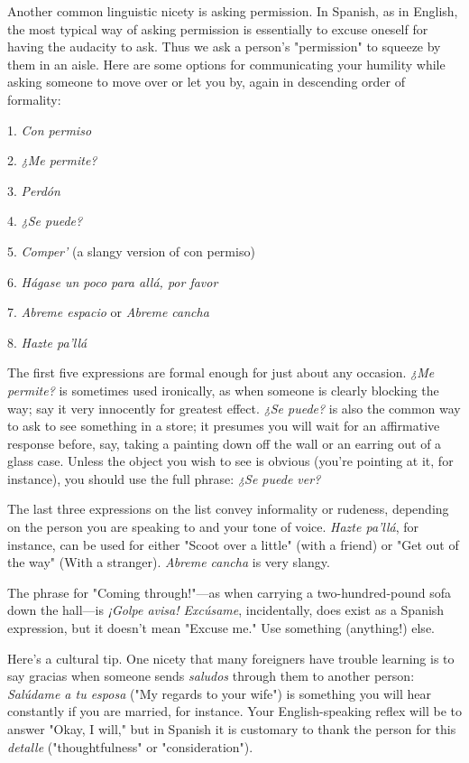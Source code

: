 \documentclass[14pt,a4paper,oneside]{memoir}
\newcommand{\bsk}{\vspace{20pt}}
\begin{document}
Another common linguistic nicety is asking permission. In
Spanish, as in English, the most typical way of asking permission is
essentially to excuse oneself for having the audacity to ask. Thus we
ask a person's "permission" to squeeze by them in an aisle. Here are
some options for communicating your humility while asking someone
to move over or let you by, again in descending order of formality:

\bsk

1. \emph{Con permiso}

2. \emph{¿Me permite?}

3. \emph{Perdón}

4. \emph{¿Se puede?}

5. \emph{Comper'} (a slangy version of con permiso)

6. \emph{Hágase un poco para allá, por favor}

7. \emph{Abreme espacio} or \emph{Abreme cancha}

8. \emph{Hazte pa'llá}

\bsk

The first five expressions are formal enough for just about any occasion. \emph{¿Me permite?} is sometimes used ironically, as when someone is
clearly blocking the way; say it very innocently for greatest effect. \emph{¿Se
puede?} is also the common way to ask to see something in a store; it
presumes you will wait for an affirmative response before, say, taking a
painting down off the wall or an earring out of a glass case. Unless the
object you wish to see is obvious (you're pointing at it, for instance),
you should use the full phrase: \emph{¿Se puede ver?}

The last three expressions on the list convey informality or
rudeness, depending on the person you are speaking to and your
tone of voice. \emph{Hazte pa'llá}, for instance, can be used for either "Scoot
over a little" (with a friend) or "Get out of the way" (With a stranger).
\emph{Abreme cancha} is very slangy.

The phrase for "Coming through!"---as when carrying a two-hundred-pound sofa down the hall---is \emph{¡Golpe avisa! Excúsame}, incidentally, does exist as a Spanish expression, but it doesn't mean "Excuse me." Use something (anything!) else.

Here's a cultural tip. One nicety that many foreigners
have trouble learning is to say gracias when someone sends \emph{saludos}
through them to another person: \emph{Salúdame a tu esposa} ("My regards to your wife") is something you will hear constantly if you are
married, for instance. Your English-speaking reflex will be to answer
"Okay, I will," but in Spanish it is customary to thank the person for
this \emph{detalle} ("thoughtfulness" or "consideration").
\end{document}
